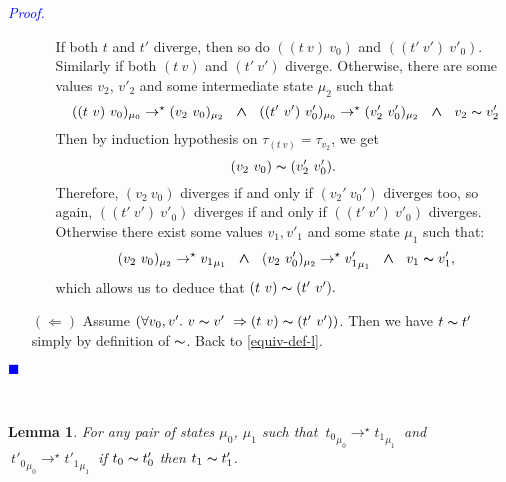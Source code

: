 \documentclass[a4paper,11pt,oneside]{article}
\theoremstyle{plain}
\newtheorem{lemma}[definition]{Lemma}
\renewenvironment{proof}{\noindent \begin{adjustwidth}{1.5em}{} \textcolor{blue}{\textit{Proof.}}}
{{\begin{tiny}\textcolor{blue}{$\blacksquare$}\end{tiny}}
\end{adjustwidth}~\\\noindent}
\newcommand{\tmapp}[2]{(#1 ~ #2)}
\newcommand{\ty}[1][]{\tau_{#1}}
\newcommand{\bwedge}{\boldsymbol{~\wedge~}}
\newcommand{\evalstar}[4]{~#1_{\mu_#2} \rightarrow^{\star} #3_{\mu_#4} ~}
\newcommand{\eqv}[1]{#1 \thicksim #1'}
\begin{document}
\begin{proof}
\begin{itemize}
\begin{itemize}
		If both $t$ and $t'$ diverge,
		then so do 
		$\tmapp{\tmapp{t}{v}}{v_0}$ and
                $\tmapp{\tmapp{t'}{v'}}{v'_0}$.
                Similarly if both $\tmapp{t}{v}$ and $\tmapp{t'}{v'}$ diverge.
		Otherwise, there are
		some values $v_2$, $v'_2$ and some intermediate state $\mu_2$ such that
		$$\evalstar{\tmapp{\tmapp{t}{v}}{v_0}}{0}{\tmapp{v_2}{v_0}}{2} \bwedge
		\evalstar{\tmapp{\tmapp{t'}{v'}}{v'_0}}{0}{\tmapp{v'_2}{v'_0}}{2} 
		\bwedge~\eqv{v_2}$$	
		Then by induction hypothesis on $\ty[\tmapp{t}{v}]=\ty[v_2]$, we 
		get	$$ \tmapp{v_2}{v_0} \thicksim \tmapp{v'_2}{v'_0}.$$ Therefore, 
		$\tmapp{v_2}{v_0}$ diverges if and only if $\tmapp{v_2'}{v_0'}$ diverges 
		too, so again, $\tmapp{\tmapp{t'}{v'}}{v'_0}$ diverges if and only if 
		$\tmapp{\tmapp{t'}{v'}}{v'_0}$ diverges. Otherwise
                there exist some values $v_1, v'_1$ and some state $\mu_1$ such that:
		$$\evalstar{\tmapp{v_2}{v_0}}{2}{{v_1}}{1} \bwedge
		\evalstar{\tmapp{v_2}{v'_0}}{2}{{v'_1}}{1} 
		\bwedge~\eqv{v_1},$$ which allows us to deduce that $\tmapp{t}{v} \thicksim \tmapp{t'}{v'}.$ 
		\end{itemize}
		
	
		\item[$(\Leftarrow)$] Assume $(\forall v_0, v'.~\eqv{v}~\Rightarrow
		\tmapp{t}{v} \thicksim \tmapp{t'}{v'})$. 
		Then we have $\eqv{t}$ simply by definition of $\thicksim$. Back to \ref{equiv-def-l}.
				
		\end{itemize}	
	\end{proof}

	\begin{lemma}
		For any pair of states $\mu_0$, $\mu_1$ such that
		$\evalstar{{t_0}}{0}{{t_1}}{1}$ and $\evalstar{{t'_0}}{0}{{t'_1}}{1}$
		if $\eqv{t_0}$ then $\eqv{t_1}$.
		\label{equiv-red2-p}
	\end{lemma}
	
\end{document}

